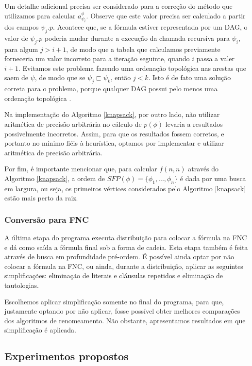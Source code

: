 Um detalhe adicional precisa ser considerado para a correção do método que utilizamos para calcular $a_{\psi_i}^\phi$. Observe que este valor precisa ser calculado a partir dos campos $\psi_j.p$. Acontece que, se a fórmula estiver representada por um DAG, o valor de $\psi_j.p$ poderia mudar durante a execução da chamada recursiva para $\psi_i$, para algum $j > i+1$, de modo que a tabela que calculamos previamente forneceria um valor incorreto para a iteração seguinte, quando $i$ passa a valer $i+1$. Evitamos este problema fazendo uma ordenação topológica nas arestas que saem de $\psi$, de modo que se $\psi_j \sqsubset \psi_k$, então $j < k$. Isto é de fato uma solução correta para o problema, porque qualquer DAG possui pelo menos uma ordenação topológica \cite{CLRS09}.

Na implementação do Algoritmo \ref{knapsack}, por outro lado, não utilizar aritmética de precisão arbitrária no cálculo de $p(\phi)$ levaria a resultados possivelmente incorretos. Assim, para que os resultados fossem corretos, e portanto no mínimo fiéis à heurística, optamos por implementar e utilizar aritmética de precisão arbitrária.

Por fim, é importante mencionar que, para calcular $f(n,n)$ através do Algoritmo \ref{knapsack}, a ordem de $SFP(\phi) = \{\phi_1,...,\phi_n \}$ é dada por uma busca em largura, ou seja, os primeiros vértices considerados pelo Algoritmo \ref{knapsack} estão mais perto da raiz.

\subsubsection{Conversão para FNC}

\indent

A última etapa do programa executa distribuição para colocar a fórmula na FNC e dá como saída a fórmula final sob a forma de cadeia. Esta etapa também é feita através de busca em profundidade pré-ordem. É possível ainda optar por não colocar a fórmula na FNC, ou ainda, durante a distribuição, aplicar as seguintes simplificações: eliminação de literais e cláusulas repetidos e eliminação de tautologias.

Escolhemos aplicar simplificação somente no final do programa, para que, justamente optando por não aplicar, fosse possível obter melhores comparações dos algoritmos de renomeamento. Não obstante, apresentamos resultados em que simplificação é aplicada.

\subsection{Experimentos propostos}


